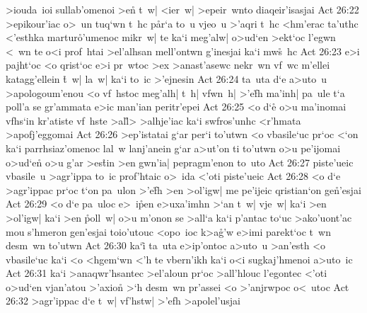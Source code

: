 >iouda~ioi
sullab'omenoi
>e\r{n}
t~w|
<ier~w|
>epeir~wnto
diaqeir'isasjai\bibvsend
\vs Act 26:22
>epikour'iac
o>~un
tuq`wn
t~hc
p\r{a}r`a
to~u
vjeo~u
>'aqri
t~hc
<hm'erac
ta'uthc
<'esthka
martur\r{o}'umenoc
mikr~w|
te
ka`i
meg'alw|
o>ud`en
>ekt`oc
l'egwn
<~wn
te
o<i
prof~htai
>el'alhsan
mell'ontwn
g'inesjai
ka`i
mw\r{s}~hc\bibvsend
{}
\vs Act 26:23
e>i
pajht`oc
<o
qrist`oc
e>i
pr~wtoc
>ex
>anast'asewc
nekr~wn
vf~wc
m'ellei
katagg'ellein
\r{t}~w|
la~w|
ka`i
to~ic
>'ejnesin\bibvsend
\vs Act 26:24
ta~uta
d`e
a>uto~u
>apologoum'enou
<o
vf~hstoc
meg'alh|
t~h|
vfwn~h|
>'e\r{f}h
ma'inh|
pa~ule
t`a
poll'a
se
gr'ammata
e>ic
man'ian
peritr'epei\bibvsend
\vs Act 26:25
<o
d`e\r{}
o>u
ma'inomai
vfhs`in
kr'atiste
vf~hste
>al\r{l}>
>alhje'iac
ka`i
swfros'unhc
<r'hmata
>apofj'eggomai\bibvsend
\vs Act 26:26
>ep'istatai
g`ar
per`i
to'utwn
<o
vbasile`uc
pr`oc
<`on
ka`i
parrhsiaz'omenoc
lal~w
lanj'anein
g`ar
a>ut'on
ti
to'utwn
o>u
pe'ijomai
o>ud`e\r{n}
o>u
g'ar
>es\r{t}in
>en
gwn'ia|
pepragm'enon
to~uto\bibvsend
\vs Act 26:27
piste'ueic
vbasile~u
>agr'ippa
to~ic
prof'htaic
o>~ida
<'oti
piste'ueic\bibvsend
\vs Act 26:28
<o
d`e
>agr'ippac
pr`oc
t`on
pa~ulon
>'e\r{f}h
>en
>ol'igw|
me
pe'ijeic
qristian`on
ge\r{n}'esjai\bibvsend
{}
\vs Act 26:29
<o
d`e
pa~uloc
e>~i\r{p}en
e>uxa'imhn
>`an
t~w|
vje~w|
ka`i
>en
>ol'igw|
ka`i
>en
\r{p}oll~w|
o>u
m'onon
se
>all`a
ka`i
p'antac
to`uc
>ako'uont'ac
mou
s'hmeron
gen'esjai
toio'utouc
<opo~ioc
k>a\r{g}'w
e>imi
parekt`oc
t~wn
desm~wn
to'utwn\bibvsend
\vs Act 26:30
ka`i\r{}
ta~uta
e>ip'ontoc
a>uto~u
>an'esth
<o
vbasile`uc
ka`i
<o
<hgem`wn
<'h
te
vbern'ikh
ka`i
o<i
sugkaj'hmenoi
a>uto~ic\bibvsend
\vs Act 26:31
ka`i
>anaqwr'hsantec
>el'aloun
pr`oc
>all'hlouc
l'egontec
<'oti
o>ud`en
vjan'atou
>'axion\r{}
>`h
desm~wn
pr'assei
<o
>'anjrwpoc
o<~utoc\bibvsend
\vs Act 26:32
>agr'ippac
d`e
t~w|
vf'hstw|
>'efh
>apolel'usjai
